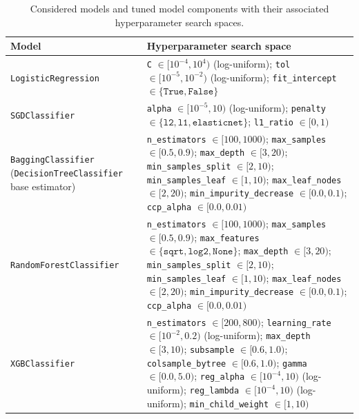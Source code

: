 \documentclass[conference]{IEEEtran}
\begin{document}
\begin{table}[t]
\centering
\caption{Considered models and tuned model components with their associated hyperparameter search spaces.}\label{tab:model-search-space}
\begin{threeparttable}
\begin{tabular}{p{4.5cm} p{12.8cm}}

\toprule
\textbf{Model} & \textbf{Hyperparameter search space} \\

\midrule
\texttt{LogisticRegression} &
\texttt{C} \(\in [10^{-4}, 10^{4})\) (log-uniform); \texttt{tol} \(\in [10^{-5}, 10^{-2})\) (log-uniform); \texttt{fit\_intercept} \(\in \{\texttt{True}, \texttt{False}\}\) \\
\midrule

\texttt{SGDClassifier} &
\texttt{alpha} \(\in [10^{-5}, 10)\) (log-uniform); \texttt{penalty} \(\in \{\texttt{l2}, \texttt{l1}, \texttt{elasticnet}\}\); \texttt{l1\_ratio} \(\in [0, 1)\) \\
\midrule

\texttt{BaggingClassifier} (\texttt{DecisionTreeClassifier} base estimator) &
\texttt{n\_estimators} \(\in [100, 1000)\); \texttt{max\_samples} \(\in [0.5, 0.9)\);
\texttt{max\_depth} \(\in [3, 20)\); \texttt{min\_samples\_split} \(\in [2, 10)\); \texttt{min\_samples\_leaf} \(\in [1, 10)\);  \texttt{max\_leaf\_nodes} \(\in [2, 20)\); \texttt{min\_impurity\_decrease} \(\in [0.0, 0.1)\); \texttt{ccp\_alpha} \(\in [0.0, 0.01)\) \\
\midrule

\texttt{RandomForestClassifier} &
\texttt{n\_estimators} \(\in [100, 1000)\); \texttt{max\_samples} \(\in [0.5, 0.9)\); 
\texttt{max\_features} \(\in \{\texttt{sqrt}, \texttt{log2}, \texttt{None}\}\);
\texttt{max\_depth} \(\in [3, 20)\); \texttt{min\_samples\_split} \(\in [2, 10)\); \texttt{min\_samples\_leaf} \(\in [1, 10)\);  \texttt{max\_leaf\_nodes} \(\in [2, 20)\); \texttt{min\_impurity\_decrease} \(\in [0.0, 0.1)\); \texttt{ccp\_alpha} \(\in [0.0, 0.01)\) \\
\midrule

\texttt{XGBClassifier} &
\texttt{n\_estimators} \(\in [200, 800)\); \texttt{learning\_rate} \(\in [10^{-2}, 0.2)\) (log-uniform); \texttt{max\_depth} \(\in [3, 10)\); \texttt{subsample} \(\in [0.6, 1.0)\); \texttt{colsample\_bytree} \(\in [0.6, 1.0)\); \texttt{gamma} \(\in [0.0, 5.0)\); \texttt{reg\_alpha} \(\in [10^{-4}, 10)\) (log-uniform); \texttt{reg\_lambda} \(\in [10^{-4}, 10)\) (log-uniform); \texttt{min\_child\_weight} \(\in [1, 10)\) \\
\midrule


\end{tabular}
\end{threeparttable}
\end{table}
\end{document}

